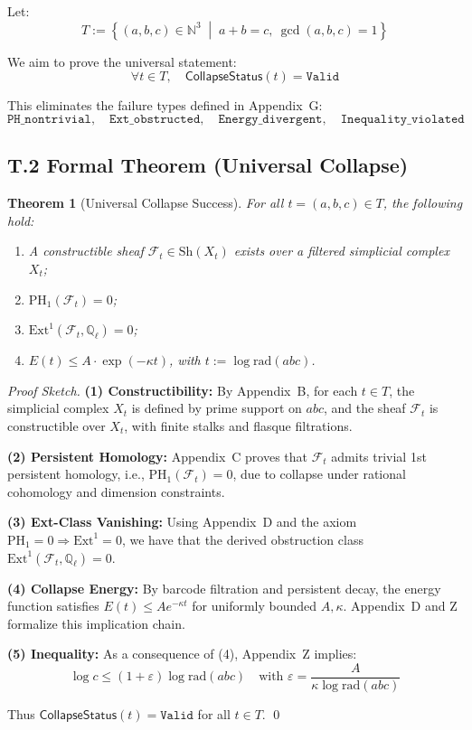 \documentclass[11pt]{article}
\newtheorem{theorem}{Theorem}[section]
\begin{document}
Let:
\[
T := \left\{ (a,b,c) \in \mathbb{N}^3 \;\middle|\; a + b = c,\ \gcd(a,b,c) = 1 \right\}
\]

We aim to prove the universal statement:
\[
\boxed{
\forall t \in T, \quad \mathsf{CollapseStatus}(t) = \texttt{Valid}
}
\]

This eliminates the failure types defined in Appendix~G:
\[
\texttt{PH\_nontrivial},\quad \texttt{Ext\_obstructed},\quad \texttt{Energy\_divergent},\quad \texttt{Inequality\_violated}
\]

\subsection*{T.2 Formal Theorem (Universal Collapse)}

\begin{theorem}[Universal Collapse Success]
For all \( t = (a,b,c) \in T \), the following hold:
\begin{enumerate}
  \item A constructible sheaf \( \mathcal{F}_t \in \mathrm{Sh}(X_t) \) exists over a filtered simplicial complex \( X_t \);
  \item \( \mathrm{PH}_1(\mathcal{F}_t) = 0 \);
  \item \( \mathrm{Ext}^1(\mathcal{F}_t, \mathbb{Q}_\ell) = 0 \);
  \item \( E(t) \leq A \cdot \exp(-\kappa t) \), with \( t := \log \mathrm{rad}(abc) \).
\end{enumerate}
\end{theorem}

\begin{proof}[Proof Sketch]
\leavevmode

\textbf{(1) Constructibility:}  
By Appendix~B, for each \( t \in T \), the simplicial complex \( X_t \) is defined by prime support on \( abc \),  
and the sheaf \( \mathcal{F}_t \) is constructible over \( X_t \), with finite stalks and flasque filtrations.

\textbf{(2) Persistent Homology:}  
Appendix~C proves that \( \mathcal{F}_t \) admits trivial 1st persistent homology,  
i.e., \( \mathrm{PH}_1(\mathcal{F}_t) = 0 \), due to collapse under rational cohomology and dimension constraints.

\textbf{(3) Ext-Class Vanishing:}  
Using Appendix~D and the axiom \( \mathrm{PH}_1 = 0 \Rightarrow \mathrm{Ext}^1 = 0 \),  
we have that the derived obstruction class \( \mathrm{Ext}^1(\mathcal{F}_t, \mathbb{Q}_\ell) = 0 \).

\textbf{(4) Collapse Energy:}  
By barcode filtration and persistent decay, the energy function satisfies \( E(t) \leq A e^{-\kappa t} \)  
for uniformly bounded \( A, \kappa \). Appendix~D and Z formalize this implication chain.

\textbf{(5) Inequality:}  
As a consequence of (4), Appendix~Z implies:
\[
\log c \leq (1 + \varepsilon) \log \mathrm{rad}(abc)
\quad\text{with } \varepsilon = \frac{A}{\kappa \log \mathrm{rad}(abc)}
\]

Thus \( \mathsf{CollapseStatus}(t) = \texttt{Valid} \) for all \( t \in T \). \qed
\end{proof}
\end{document}
